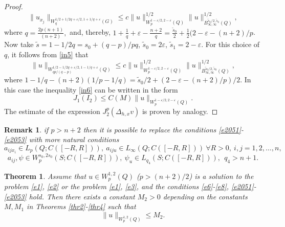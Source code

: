 \documentclass{article}
\theoremstyle{plain}
\newtheorem{theorem}{Theorem}
\newtheorem{remark}{Remark}
\begin{document}
\begin{proof}
\begin{equation}
 \|u_{x_j}\|_{W_{q}^{1/2+1/2q+\varepsilon/2,1+1/q+\varepsilon}(G)}\leq c \|u\|_{W_p^{1-\varepsilon/2,2-\varepsilon}(Q)}^{1/2}
 \|u\|_{B_{\infty,\infty}^{\tilde{s}_0/2, \tilde{s}_0}(Q)}^{1/2},
 \end{equation}
 where $q=\frac{2p(n+1)}{(n+2)}, $ and, thereby, 
 $
 1+\frac{1}{q}+\varepsilon-\frac{n+2}{q}= \frac{\tilde{s}_0}{2}+\frac{1}{2} (2-\varepsilon-(n+2)/p $.
 Now take  $\tilde{s}=1-1/2q=s_0+(q-p)/pq$, $\tilde{s}_0=2\varepsilon$,
 $\tilde{s}_1=2-\varepsilon$. For this choice of  $q$, it follows from  \eqref{in5} that 
\begin{equation}\label{in8}
 \|u\|_{W_{qp/(q-p)}^{1/2-1/2q+\varepsilon/2,1-1/q+\varepsilon}(Q)}\leq c \|u\|_{W_p^{1-\varepsilon/2,2-\varepsilon}(Q)}^{1/2}
 \|u\|_{B_{\infty,\infty}^{\tilde{s}_0/2, \tilde{s}_0}(Q)}^{1/2},
 \end{equation}
 where  $1-1/q-(n+2)(1/p-1/q)= \tilde{s}_0/2+ (2-\varepsilon-(n+2)/p)/2. $
 In this case the inequality  \eqref{in6} can be written in the form 
 \begin{equation}\label{in10}
J_1(I_2)\leq C(M) \|u\|_{W_p^{1-\varepsilon/2,2-\varepsilon}(Q)}.  
\end{equation}
The estimate of the expression   $J_2^p(\Delta_{h,x} v)$ is proven by analogy.  
\end{proof}


\begin{remark}  if  $p>n+2$ then it is possible to replace the conditions  \eqref{e2051}-\eqref{e2053} with more natural conditions 
\begin{equation}\label{e251}
a_{ijx_i}\in L_{p}(Q;C([-R,R])), \ a_{iju}\in L_\infty(Q;C([-R,R])) \  \forall R>0, \ i,j=1,2,\ldots,n, 
\end{equation}
\begin{equation}\label{e25}
a_{ij},\psi\in W_p^{s_0,2s_0}(S;C([-R,R])),   \ \psi_u\in L_{q_4}(S;C([-R,R])), \  \ q_4> n+1.
\end{equation}
\end{remark}



\begin{theorem} \label{thr5}
 Assume that  $u\in W_p^{1,2}(Q)$ ($p>(n+2)/2$) is a solution  to the problem  {\rm \eqref{e1}, \eqref{e2}} or the problem  {\rm \eqref{e1}, \eqref{e3}}, and the conditions 
   {\rm \eqref{e6}-\eqref{e8}, \eqref{e2051}- \eqref{e2053}} hold.    
Then there exists a constant  $M_2>0$ depending on the constants  $M, M_1$ in Theorems  {\rm   \ref{thr2}-\ref{thr4}} such that 
\begin{equation}\label{e259}
\|u\|_{W_p^{1,2}(Q)} \leq M_2.
\end{equation}
 \end{theorem}
 
\end{document}

